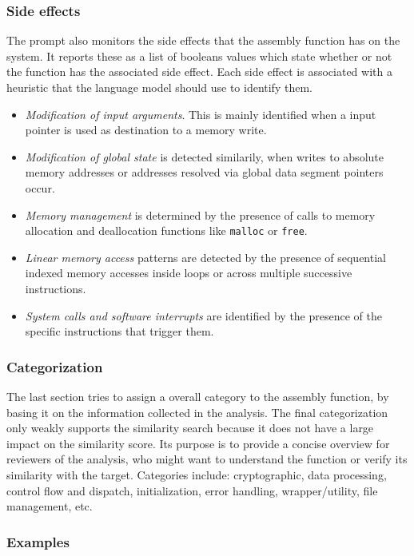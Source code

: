 \documentclass[conference,compsoc]{IEEEtran}
\begin{document}
\subsubsection{Side effects}

The prompt also monitors the side effects that the assembly function has on the system.
It reports these as a list of booleans values which state whether or not the function has
the associated side effect. Each side effect is associated with a heuristic that the language model
should use to identify them.

\begin{itemize}
    \item \textit{Modification of input arguments}. This is mainly identified when a input pointer is used as destination to a memory write.
    \item \textit{Modification of global state} is detected similarily, when writes to absolute memory addresses or addresses resolved via global
        data segment pointers occur.
    \item \textit{Memory management} is determined by the presence of calls to memory allocation and deallocation
        functions like \texttt{malloc} or \texttt{free}.
    \item \textit{Linear memory access} patterns are detected by the presence of sequential indexed memory accesses inside loops or
        across multiple successive instructions.
    \item \textit{System calls and software interrupts} are identified by the presence of the specific instructions that trigger them.
\end{itemize}

\subsubsection{Categorization}

The last section tries to assign a overall category to the assembly function, by basing it on the information
collected in the analysis. The final categorization only weakly supports the similarity search because it does
not have a large impact on the similarity score. Its purpose is to provide a concise overview for reviewers
of the analysis, who might want to understand the function or verify its similarity with the target.
Categories include: cryptographic, data processing, control flow and dispatch, initialization, error handling,
wrapper/utility, file management, etc.

\subsubsection{Examples}
\end{document}
